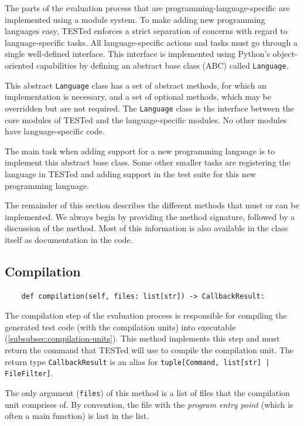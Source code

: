 \documentclass[../main]{subfiles}
\begin{document}
The parts of the evaluation process that are programming-language-specific are implemented using a module system.
To make adding new programming languages easy, TESTed enforces a strict separation of concerns with regard to language-specific tasks.
All language-specific actions and tasks must go through a single well-defined interface.
This interface is implemented using Python's object-oriented capabilities by defining an abstract base class (ABC) called \texttt{Language}.

This abstract \texttt{Language} class has a set of abstract methods, for which an implementation is necessary, and a set of optional methods, which may be overridden but are not required.
The \texttt{Language} class is the interface between the core modules of TESTed and the language-specific modules.
No other modules have language-specific code.

The main task when adding support for a new programming language is to implement this abstract base class.
Some other smaller tasks are registering the language in TESTed and adding support in the test suite for this new programming language.

The remainder of this section describes the different methods that must or can be implemented.
We always begin by providing the method signature, followed by a discussion of the method.
Most of this information is also available in the class itself as documentation in the code.

\subsection{Compilation}\label{subsec:impl-compilation}

\begin{verbatim}
    def compilation(self, files: list[str]) -> CallbackResult:
\end{verbatim}

The compilation step of the evaluation process is responsible for compiling the generated test code (with the compilation units) into executable (\vref{subsubsec:compilation-units}).
This method implements this step and must return the command that TESTed will use to compile the compilation unit.
The return type \texttt{CallbackResult} is an alias for \texttt{tuple[Command, list[str] | FileFilter]}.

The only argument (\texttt{files}) of this method is a list of files that the compilation unit comprises of.
By convention, the file with the \emph{program entry point} (which is often a main function) is last in the list.
\end{document}
